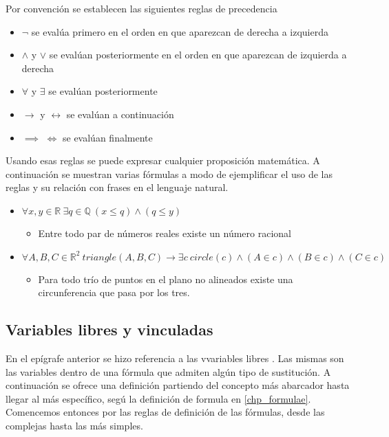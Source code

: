 Por convención se establecen las siguientes reglas de precedencia

\begin{itemize}
	\item{$\neg$ se evalúa primero en el orden en que aparezcan de derecha a izquierda}
	\item{$\land$ y $\lor$ se evalúan posteriormente en el orden en que aparezcan de izquierda a derecha}
	\item{$\forall$ y $\exists$ se evalúan posteriormente}
	\item{$\to$ y $\leftrightarrow$ se evalúan a continuación}
	\item{$\implies$ $\iff$ se evalúan finalmente}
\end{itemize}

Usando esas reglas se puede expresar cualquier proposición matemática. A continuación se muestran varias fórmulas a modo de ejemplificar el uso de las reglas y su relación con frases en el lenguaje natural.

\begin{itemize}
	\item{$\forall x,y \in \mathbb{R}\ \exists q \in \mathbb{Q}\ (x \leq q) \land (q \leq y)$ }
		\begin{itemize}
			\item{Entre todo par de números reales existe un número racional}
		\end{itemize}
	\item{$\forall A,B,C \in \mathbb{R}^2\ triangle(A, B, C) \to \exists c\ circle(c) \land (A \in c) \land (B \in c) \land (C \in c)$ }
		\begin{itemize}
			\item{Para todo trío de puntos en el plano no alineados existe una circunferencia que pasa por los tres.}
		\end{itemize}
\end{itemize}

\subsection{Variables libres y vinculadas}

En el epígrafe anterior se hizo referencia a las vvariables libres . Las mismas son las variables dentro de una fórmula que admiten algún tipo de sustitución. A continuación se ofrece una definición partiendo del concepto más abarcador hasta llegar al más específico, segú la definición de formula en \cref{chp_formulae}. Comencemos entonces por las reglas de definición de las fórmulas, desde las complejas hasta las más simples.

